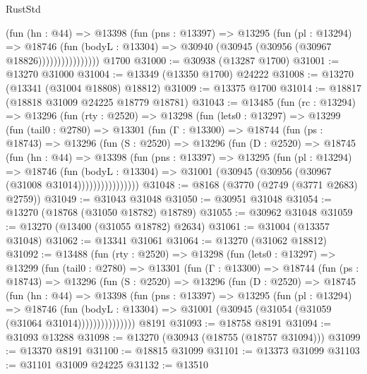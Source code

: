 \begin{lexlean}{RustStd}
\begin{coremodule}
                      (fun (hn : @44) =>
                      @13398
                        (fun (pns : @13397) =>
                        @13295
                          (fun (pl : @13294) =>
                          @18746
                            (fun (bodyL : @13304) =>
                            @30940 (@30945 (@30956 (@30967 @18826))))))))))))))))
    @1700
@31000 := @30938 (@13287 @1700)
@31001 := @13270 @31000
@31004 := @13349 (@13350 @1700) @24222
@31008 := @13270 (@13341 (@31004 @18808) @18812)
@31009 := @13375 @1700
@31014 := @18817 (@18818 @31009 @24225 @18779 @18781)
@31043 := @13485
    (fun (rc : @13294) =>
    @13296
      (fun (rty : @2520) =>
      @13298
        (fun (lets0 : @13297) =>
        @13299
          (fun (tail0 : @2780) =>
          @13301
            (fun (Γ : @13300) =>
            @18744
              (fun (ps : @18743) =>
              @13296
                (fun (S : @2520) =>
                @13296
                  (fun (D : @2520) =>
                  @18745
                    (fun (hn : @44) =>
                    @13398
                      (fun (pns : @13397) =>
                      @13295
                        (fun (pl : @13294) =>
                        @18746
                          (fun (bodyL : @13304) =>
                          @31001 (@30945 (@30956 (@30967 (@31008 @31014))))))))))))))))
@31048 := @8168 (@3770 (@2749 (@3771 @2683) @2759))
@31049 := @31043 @31048
@31050 := @30951 @31048
@31054 := @13270 (@18768 (@31050 @18782) @18789)
@31055 := @30962 @31048
@31059 := @13270 (@13400 (@31055 @18782) @2634)
@31061 := @31004 (@13357 @31048)
@31062 := @13341 @31061
@31064 := @13270 (@31062 @18812)
@31092 := @13488
    (fun (rty : @2520) =>
    @13298
      (fun (lets0 : @13297) =>
      @13299
        (fun (tail0 : @2780) =>
        @13301
          (fun (Γ : @13300) =>
          @18744
            (fun (ps : @18743) =>
            @13296
              (fun (S : @2520) =>
              @13296
                (fun (D : @2520) =>
                @18745
                  (fun (hn : @44) =>
                  @13398
                    (fun (pns : @13397) =>
                    @13295
                      (fun (pl : @13294) =>
                      @18746
                        (fun (bodyL : @13304) =>
                        @31001 (@30945 (@31054 (@31059 (@31064 @31014)))))))))))))))
    @8191
@31093 := @18758 @8191
@31094 := @31093 @13288
@31098 := @13270 (@30943 (@18755 (@18757 @31094)))
@31099 := @13370 @8191
@31100 := @18815 @31099
@31101 := @13373 @31099
@31103 := @31101 @31009 @24225
@31132 := @13510

\end{coremodule}
\end{lexlean}
